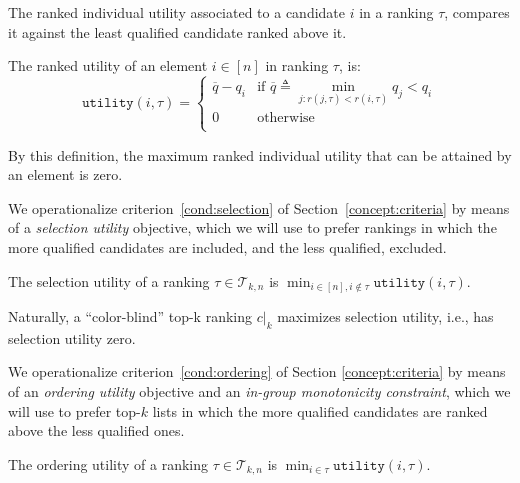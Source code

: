 The ranked individual utility associated to a candidate $i$ in a ranking $\tau$, compares it against the least qualified candidate ranked above it.

\begin{definition}
	\label{def:rankedIndividualFairness}
	The ranked utility of an element $i \in [n]$ in ranking $\tau$, is:
	\[
	\texttt{utility}(i,\tau) = \begin{cases}
	\overline{q} - q_i & \textrm{if~} \overline{q} \triangleq \min_{j: r(j,\tau) < r(i,\tau)} q_j < q_i \\
	0 & \textrm{otherwise}\\
	\end{cases}
	\]
\end{definition}
%
\noindent By this definition, the maximum ranked individual utility that can be attained by an element is zero.
%

%
We operationalize criterion~\ref{cond:selection} of Section~\ref{concept:criteria} by means of a \emph{selection utility} objective, which we will use to prefer rankings in which the more qualified candidates are included, and the less qualified, excluded.
%
\begin{definition}
	\label{def:selectionFairness}
	The selection utility of a ranking $\tau \in {\mathcal T}_{k,n}$ is $\min_{i \in [n], i \notin \tau} \texttt{utility}(i,\tau)$.
\end{definition}
%
\noindent Naturally, a ``color-blind'' top-k ranking $c|_k$ maximizes selection utility, i.e., has selection utility zero.

%
We operationalize criterion~\ref{cond:ordering} of Section \ref{concept:criteria} by means of an \emph{ordering utility} objective and an \emph{in-group monotonicity constraint}, which we will use to prefer top-$k$ lists in which the more qualified candidates are ranked above the less qualified ones.

\begin{definition}
	\label{def:orderingFairness}
	The ordering utility of a ranking $\tau \in {\mathcal T}_{k,n}$ is $\min_{i \in \tau} \texttt{utility}(i,\tau)$.
\end{definition}

